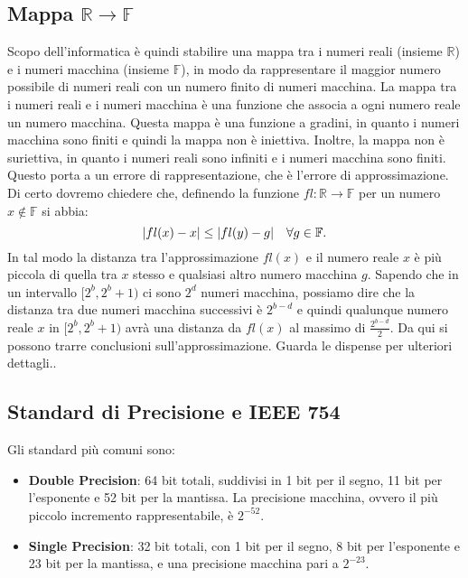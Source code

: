 \documentclass[letterpaper,12pt]{article}
\DeclarePairedDelimiter{\abs}{\lvert}{\rvert} %
\newcommand{\numberset}{\mathbb}
\newcommand{\F}{\numberset{F}}
\newcommand{\R}{\numberset{R}}
\begin{document}
    \subsection{Mappa $ \R \rightarrow \F$}
        Scopo dell'informatica è quindi stabilire una mappa tra i numeri reali (insieme $\R$) e i numeri macchina (insieme $\F$), 
        in modo da rappresentare il maggior numero possibile di numeri reali con un numero finito di numeri macchina. 
        La mappa tra i numeri reali e i numeri macchina è una funzione che associa a ogni numero reale un numero macchina.
        Questa mappa è una funzione a gradini, in quanto i numeri macchina sono finiti e quindi la mappa non è iniettiva.
        Inoltre, la mappa non è suriettiva, in quanto i numeri reali sono infiniti e i numeri macchina sono finiti. 
        Questo porta a un errore di rappresentazione, che è l'errore di approssimazione.
        Di certo dovremo chiedere che, definendo la funzione $fl : \R \rightarrow \F$ per un numero $x \not\in \F$ si abbia:
        \[
            \abs{fl(x) - x} \leq \abs{fl(y) - g} \quad \forall g \in \F.
        \]
        In tal modo la distanza tra l'approssimazione $fl(x)$ e il numero reale $x$ è più piccola di quella tra $x$ 
        stesso e qualsiasi altro numero macchina $g$. Sapendo che in un intervallo $[2^b, 2^b+1)$ ci sono $2^d$ numeri
        macchina, possiamo dire che la distanza tra due numeri macchina successivi è $2^{b-d}$ e quindi qualunque numero 
        reale $x$ in $[2^b, 2^b+1)$ avrà una distanza da $fl(x)$ al massimo di $\frac{2^{b-d}}{2}$.
        Da qui si possono trarre conclusioni sull'approssimazione. Guarda le dispense per ulteriori dettagli..

    
    \subsection{Standard di Precisione e IEEE 754}
        Gli standard più comuni sono:
        \begin{itemize}
            \item \textbf{Double Precision}: 64 bit totali, suddivisi in 1 bit per il segno, 11 bit per l'esponente e 
            52 bit per la mantissa. La precisione macchina, ovvero il più piccolo incremento rappresentabile, è $2^{-52}$.
            \item \textbf{Single Precision}: 32 bit totali, con 1 bit per il segno, 8 bit per l'esponente e 23 bit per 
            la mantissa, e una precisione macchina pari a $2^{-23}$.
        \end{itemize}
\end{document}
